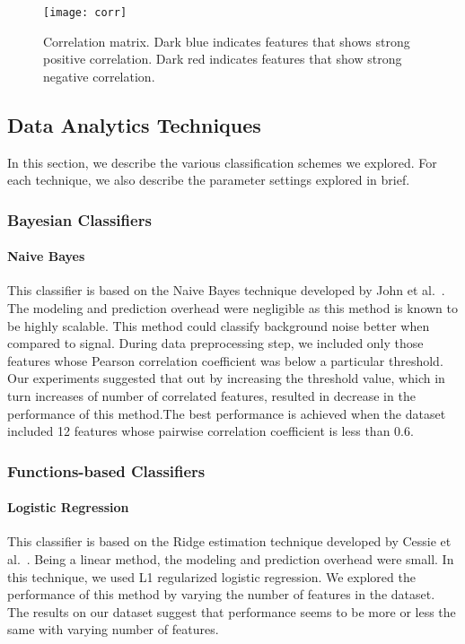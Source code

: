 \begin{figure}[h]
\centering
\texttt{[image: corr]}
\caption{Correlation matrix. Dark blue indicates features that shows strong positive correlation. Dark red indicates features that show strong negative correlation.}
\label{fig:correlation-matrix}
\end{figure}



\subsection{Data Analytics Techniques}

In this section, we describe the various classification schemes we explored. For each technique, we also describe the parameter settings explored in brief.


\subsubsection{Bayesian Classifiers}

\paragraph{Naive Bayes}

This classifier is based on the Naive Bayes technique developed by John et al.~\cite{NaiveBayes}. The modeling and prediction overhead were negligible as this method is known to be highly scalable. This method could classify background noise better when compared to signal. During data preprocessing step, we included only those features whose Pearson correlation coefficient was below a particular threshold. Our experiments suggested that out by increasing the threshold value, which in turn increases of number of correlated features, resulted in decrease in the performance of this method.The best performance is achieved when the dataset included 12 features whose pairwise correlation coefficient is less than 0.6.	

\subsubsection{Functions-based Classifiers}

\paragraph{Logistic Regression}

This classifier is based on the Ridge estimation technique developed by Cessie et al.~\cite{Logistic Regression}. Being a linear method, the modeling and prediction overhead were small. In this technique, we used L1 regularized logistic regression. We explored the performance of this method
by varying the number of features in the dataset. The results on our dataset suggest that performance seems to be more or less the same with varying number of features.

